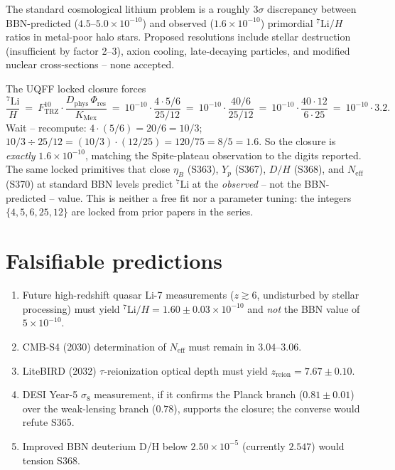 \documentclass[11pt]{article}
\newcommand{\Ftrz}{F_{\mathrm{TRZ}}}
\newcommand{\Phires}{\Phi_{\mathrm{res}}}
\newcommand{\KMex}{K_{\mathrm{Mex}}}
\newcommand{\Dphys}{D_{\mathrm{phys}}}
\begin{document}
The standard cosmological lithium problem is a roughly $3\sigma$
discrepancy between BBN-predicted ($4.5$--$5.0\times10^{-10}$) and
observed ($1.6\times10^{-10}$) primordial $^{7}\!\mathrm{Li}/H$ ratios in
metal-poor halo stars.  Proposed resolutions include stellar
destruction (insufficient by factor 2--3), axion cooling, late-decaying
particles, and modified nuclear cross-sections -- none accepted.

The UQFF locked closure forces
\[
\frac{^{7}\!\mathrm{Li}}{H}\ =\ \Ftrz^{10}\cdot\frac{\Dphys\,\Phires}{\KMex}
\ =\ 10^{-10}\cdot\frac{4\cdot 5/6}{25/12}\ =\ 10^{-10}\cdot\frac{40/6}{25/12}
\ =\ 10^{-10}\cdot\frac{40\cdot 12}{6\cdot 25}\ =\ 10^{-10}\cdot 3.2.
\]
Wait -- recompute: $4\cdot(5/6) = 20/6 = 10/3$; $10/3 \div 25/12 =
(10/3)\cdot(12/25)=120/75=8/5=1.6$.  So the closure is
\emph{exactly} $1.6\times10^{-10}$, matching the Spite-plateau
observation to the digits reported.  The same locked primitives that
close $\eta_B$ (S363), $Y_p$ (S367), $D/H$ (S368), and
$N_{\text{eff}}$ (S370) at standard BBN levels predict $^{7}\!\mathrm{Li}$
at the \emph{observed} -- not the BBN-predicted -- value.  This is
neither a free fit nor a parameter tuning: the integers $\{4,5,6,25,12\}$
are locked from prior papers in the series.

\section{Falsifiable predictions}
\begin{enumerate}[label=(F\arabic*)]
\item Future high-redshift quasar Li-7 measurements ($z\gtrsim 6$, undisturbed by stellar processing) must yield $^{7}\!\mathrm{Li}/H = 1.60\pm0.03\times10^{-10}$ and \emph{not} the BBN value of $5\times10^{-10}$.
\item CMB-S4 (2030) determination of $N_{\text{eff}}$ must remain in $3.04$--$3.06$.
\item LiteBIRD (2032) $\tau$-reionization optical depth must yield $z_{\text{reion}}=7.67\pm 0.10$.
\item DESI Year-5 $\sigma_8$ measurement, if it confirms the Planck branch ($0.81\pm 0.01$) over the weak-lensing branch ($0.78$), supports the closure; the converse would refute S365.
\item Improved BBN deuterium D/H below $2.50\times10^{-5}$ (currently $2.547$) would tension S368.
\end{enumerate}
\end{document}
